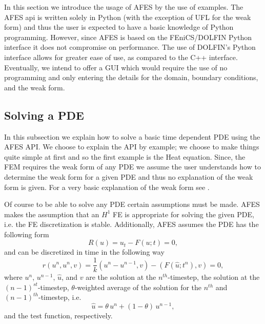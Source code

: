 In this section we introduce the usage of AFES by the use of examples. The AFES
api is written solely in Python (with the exception of UFL for the weak form)
and thus the user is expected to have a basic knowledge of Python programming.
However, since AFES is based on the FEniCS/DOLFIN Python interface it does not
compromise on performance\cite{Alnae2011}. The use of DOLFIN's Python interface
allows for greater ease of use, as compared to the C++ interface. Eventually, we
intend to offer a GUI which would require the use of no programming and only
entering the details for the domain, boundary conditions, and the weak form.

\subsection{Solving a PDE} \label{sse:Solver}

    In this subsection we explain how to solve a basic time dependent PDE using
    the AFES API. We choose to explain the API by example; we choose to
    make things quite simple at first and so the first example is the Heat
    equation.  Since, the FEM requires the weak form of any PDE we assume
    the user understands how to determine the weak form for a given PDE and thus
    no explanation of the weak form is given. For a very basic explanation of
    the weak form see \cite[Chapter 6.2.2]{Eriksson2009}.

    Of course to be able to solve any PDE certain assumptions must be made. AFES
    makes the assumption that an $H^1$ FE is appropriate for solving the given
    PDE, i.e. the FE discretization is stable. Additionally, AFES assumes the
    PDE has the following form
    \begin{equation}
        R(u) = u_t - F(u;t) = 0,
        \label{eq:BasicForm}
    \end{equation}
    and can be discretized in time in the following way
    \begin{equation}
        r(u^n, u^n, v) = \frac{1}{k} (u^n - u^{n-1}, v) - (F(\hat{u};t^n), v) = 0,
        \label{eq:WeakResidual}
    \end{equation}
    where $u^n,\, u^{n-1},\, \hat{u}$, and $v$ are the solution at the
    $n^{th}$-timestep, the solution at the $(n-1)^{st}$-timestep,
    $\theta$-weighted average of the solution for the $n^{th}$ and
    $(n-1)^{th}$-timestep, i.e.
    \begin{equation}
        \hat{u} = \theta\, u^n + (1 - \theta)\, u^{n-1},
        \label{eq:uAvg}
    \end{equation}
    and the test function, respectively.


